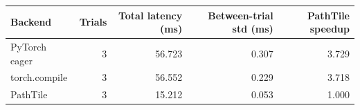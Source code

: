 \begin{tabular}{lrrrr}
\toprule
Backend & Trials & Total latency (ms) & Between-trial std (ms) & PathTile speedup \\
\midrule
PyTorch eager & 3 & 56.723 & 0.307 & 3.729 \\
torch.compile & 3 & 56.552 & 0.229 & 3.718 \\
PathTile & 3 & 15.212 & 0.053 & 1.000 \\
\bottomrule
\end{tabular}

